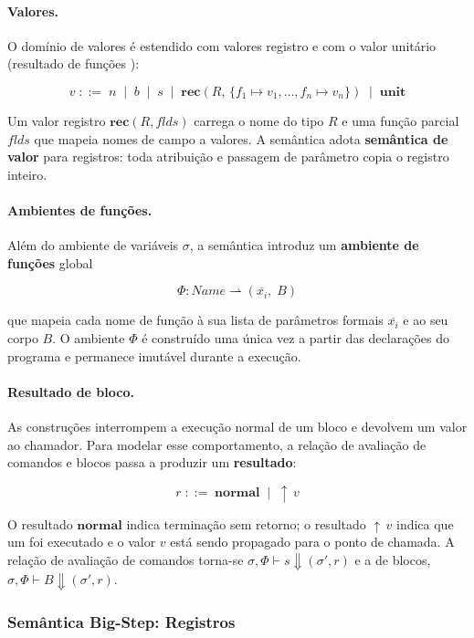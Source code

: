 \paragraph{Valores.}
O domínio de valores é estendido com valores registro e com o valor
unitário (resultado de funções ):

\[
  v \;::=\; n \;\mid\; b \;\mid\; s \;\mid\;
  \mathbf{rec}(R,\, \{f_1 \mapsto v_1, \ldots, f_n \mapsto v_n\})
  \;\mid\; \mathbf{unit}
\]

Um valor registro \(\mathbf{rec}(R, \mathit{flds})\) carrega o nome do
tipo \(R\) e uma função parcial \(\mathit{flds}\) que mapeia nomes de
campo a valores. A semântica adota \textbf{semântica de valor} para
registros: toda atribuição e passagem de parâmetro copia o registro
inteiro.

\paragraph{Ambientes de funções.}
Além do ambiente de variáveis \(\sigma\), a semântica introduz um
\textbf{ambiente de funções} global

\[
  \Phi : \mathit{Name} \rightharpoonup
  (\overline{x_i},\; B)
\]

que mapeia cada nome de função à sua lista de parâmetros formais
\(\overline{x_i}\) e ao seu corpo \(B\). O ambiente \(\Phi\) é
construído uma única vez a partir das declarações do programa e
permanece imutável durante a execução.

\paragraph{Resultado de bloco.}
As construções  interrompem a execução normal de um
bloco e devolvem um valor ao chamador. Para modelar esse comportamento,
a relação de avaliação de comandos e blocos passa a produzir um
\textbf{resultado}:

\[
  r \;::=\; \mathbf{normal} \;\mid\; {\uparrow}\, v
\]

O resultado \(\mathbf{normal}\) indica terminação sem retorno; o
resultado \({\uparrow}\, v\) indica que um  foi
executado e o valor \(v\) está sendo propagado para o ponto de chamada.
A relação de avaliação de comandos torna-se \(\sigma,\Phi \vdash s
\Downarrow (\sigma', r)\) e a de blocos, \(\sigma,\Phi \vdash B
\Downarrow (\sigma', r)\).

\subsubsection{Semântica Big-Step: Registros}


